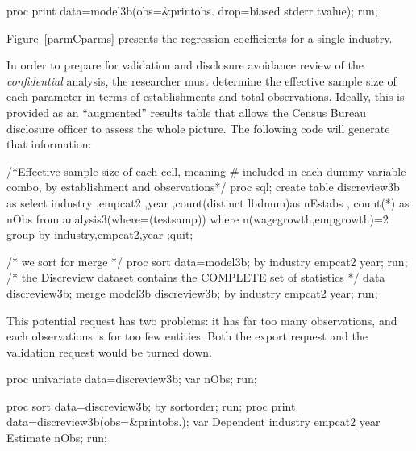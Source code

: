 \documentclass{article}
\begin{document}
\begin{Sascode}[program,store=parmc]
proc print data=model3b(obs=&printobs. drop=biased stderr tvalue);
run;
\end{Sascode}

Figure~\ref{parmCparms} presents the regression coefficients for a single industry. 


In order to prepare for validation and disclosure avoidance review of the \textit{confidential} analysis, the researcher must determine  the effective sample size of each parameter in terms of establishments and total observations. Ideally, this is provided as an ``augmented'' results table that allows the Census Bureau disclosure officer to assess the whole picture. The following code will generate that information:
\begin{Datastep}
/*Effective sample size of each cell, meaning # included in each 
  dummy variable combo, by establishment and observations*/
proc sql;
create table discreview3b as
select industry
      ,empcat2
      ,year
      ,count(distinct lbdnum)as nEstabs
      , count(*) as nObs
from analysis3(where=(testsamp))
where n(wagegrowth,empgrowth)=2
group by industry,empcat2,year
;quit;

/* we sort for merge */
proc sort data=model3b;
by industry empcat2 year;
run;
/* the Discreview dataset contains the COMPLETE set of statistics */
data discreview3b;
	merge model3b discreview3b;
	by industry empcat2 year;
	run;

\end{Datastep}

This potential request has two problems: it has far too many observations, and each observations is for too few entities. Both the export request and the validation request would be turned down.

\begin{Sascode}[store=exreview3b,program]
proc univariate data=discreview3b;
var nObs;
run;
\end{Sascode}

\begin{Sascode}[program,store=exreview3c]
proc sort data=discreview3b;
by sortorder;
run;
proc print data=discreview3b(obs=&printobs.);
var Dependent industry empcat2 year Estimate nObs;
run;
\end{Sascode}




\newpage

\appendix

\end{document}
